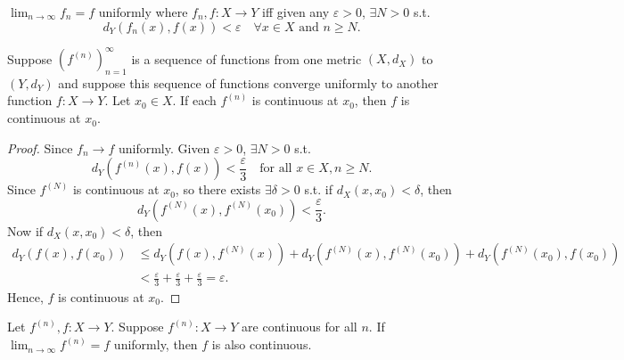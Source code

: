 \begin{prev}
    \(\lim_{n \to \infty} f_n = f \) uniformly where \(f_n, f:X \to Y\) iff given any \(\varepsilon > 0\), \(\exists N > 0\) s.t. 
    \[
        d_Y \left( f_n(x), f(x) \right) < \varepsilon \quad \forall x \in X \text{ and } n \ge N. 
    \]    
\end{prev}

\begin{theorem}[考試會考] \label{thm: uniformly convergence preserves continuity at limit}
    Suppose \(\left( f^{(n)} \right)_{n=1}^{\infty}  \) is a sequence of functions from one metric \((X, d_X)\) to \((Y, d_Y)\) and suppose this sequence of functions converge uniformly to another function \(f:X \to Y\). Let \(x_0 \in X\). If each \(f^{(n)}\) is continuous at \(x_0\), then \(f\) is continuous at \(x_0\).        
\end{theorem}

\begin{proof}
    Since \(f_n \to f\) uniformly. Given \(\varepsilon > 0\), \(\exists N > 0\) s.t. 
    \[
        d_Y \left( f^{(n)}(x), f(x) \right) < \frac{\varepsilon}{3} \quad \text{for all } x \in X, n \ge N. 
    \]   
    Since \(f^{(N)}\) is continuous at \(x_0\), so there exists \(\exists \delta > 0\) s.t. if \(d_X(x, x_0) < \delta \), then 
    \[
        d_Y \left( f^{(N)}(x), f^{(N)}(x_0) \right) < \frac{\varepsilon}{3}.
    \] 
    Now if \(d_X(x, x_0) < \delta \), then 
    \begin{align*}
        d_Y ( f(x), f(x_0)) &\le d_Y \left( f(x), f^{(N)}(x) \right) + d_Y \left( f^{(N)}(x), f^{(N)}(x_0) \right) + d_Y \left( f^{(N)}(x_0), f(x_0) \right) \\
        &< \frac{\varepsilon}{3} + \frac{\varepsilon}{3} + \frac{\varepsilon}{3} = \varepsilon. 
    \end{align*} 
    Hence, \(f\) is continuous at \(x_0\).   
\end{proof}

\begin{corollary} \label{cl: uniformly continuous preserve continuity}
    Let \(f^{(n)}, f:X \to Y\). Suppose \(f^{(n)}:X \to Y\) are continuous for all \(n\). If \(\lim_{n \to \infty} f^{(n)} = f \) uniformly, then \(f\) is also continuous.     
\end{corollary}

